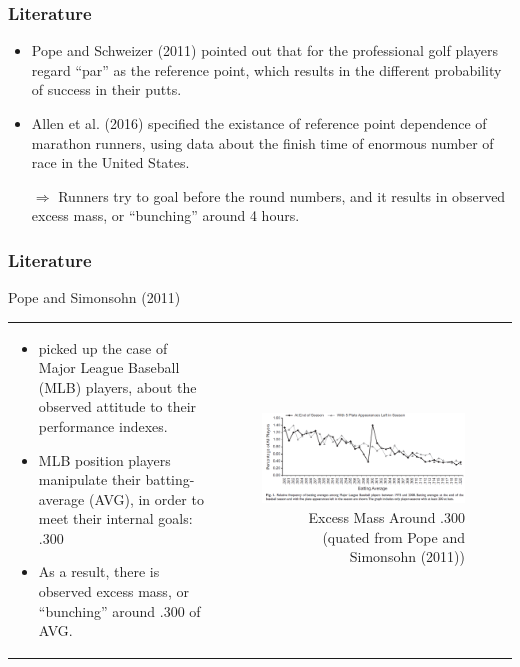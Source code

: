 \documentclass[dvipdfmx,12pt]{beamer}
\begin{document}
\begin{frame}\frametitle{Literature}
  \begin{itemize}

    \item Pope and Schweizer (2011) pointed out that for the professional golf players regard ``par'' as the reference point, which results in the different probability of success in their putts.

    \item Allen et al. (2016) specified the existance of reference point dependence of marathon runners, using data about the finish time of enormous number of race in the United States.

    $\Rightarrow$ Runners try to goal before the round numbers, and it results in observed excess mass, or ``bunching'' around 4 hours.

  \end{itemize}

\end{frame}

\begin{frame}\frametitle{Literature}
  \small
  Pope and Simonsohn (2011)
  \begin{tabular}{lr}
    \begin{minipage}[H]{0.45\textwidth}
      \footnotesize
      \begin{itemize}
        \item picked up the case of Major League Baseball (MLB) players, about the observed attitude to their performance indexes.

        \item MLB position players manipulate their batting-average (AVG), in order to meet their internal goals: .300

        \item As a result, there is observed excess mass, or ``bunching'' around .300 of AVG.
      \end{itemize}

    \end{minipage} &
    \begin{minipage}[H]{0.55\textwidth}
      \begin{figure}
        \includegraphics[keepaspectratio, scale = 0.33]{graphs/PS_fig1}
        \caption{Excess Mass Around .300 (quated from Pope and Simonsohn (2011))}
        \label{PS_fig}
      \end{figure}
    \end{minipage}
  \end{tabular}

\end{frame}
\end{document}
